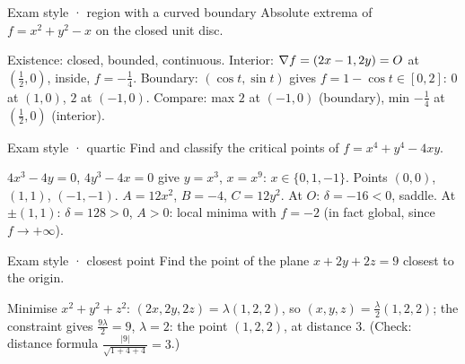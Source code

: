 \begin{problem}{Exam style · region with a curved boundary}
Absolute extrema of $f=x^2+y^2-x$ on the closed unit disc.
\end{problem}
\begin{solution}
Existence: closed, bounded, continuous. Interior: $\nabla f=(2x-1,2y)=O$ at $(\tfrac12,0)$, inside,
$f=-\tfrac14$. Boundary: $(\cos t,\sin t)$ gives $f=1-\cos t\in[0,2]$: $0$ at $(1,0)$, $2$ at $(-1,0)$.
Compare: max $2$ at $(-1,0)$ (boundary), min $-\tfrac14$ at $(\tfrac12,0)$ (interior).
\begin{center}
\end{center}
\end{solution}

\begin{problem}{Exam style · quartic}
Find and classify the critical points of $f=x^4+y^4-4xy$.
\end{problem}
\begin{solution}
$4x^3-4y=0$, $4y^3-4x=0$ give $y=x^3$, $x=x^9$: $x\in\{0,1,-1\}$. Points $(0,0)$, $(1,1)$, $(-1,-1)$.
$A=12x^2$, $B=-4$, $C=12y^2$. At $O$: $\delta=-16<0$, saddle. At $\pm(1,1)$: $\delta=128>0$, $A>0$: local
minima with $f=-2$ (in fact global, since $f\to+\infty$).
\end{solution}

\begin{problem}{Exam style · closest point}
Find the point of the plane $x+2y+2z=9$ closest to the origin.
\end{problem}
\begin{solution}
Minimise $x^2+y^2+z^2$: $(2x,2y,2z)=\lambda(1,2,2)$, so $(x,y,z)=\tfrac\lambda2(1,2,2)$; the constraint gives
$\tfrac{9\lambda}2=9$, $\lambda=2$: the point $(1,2,2)$, at distance $3$. (Check: distance formula
$\frac{|9|}{\sqrt{1+4+4}}=3$.)
\end{solution}


